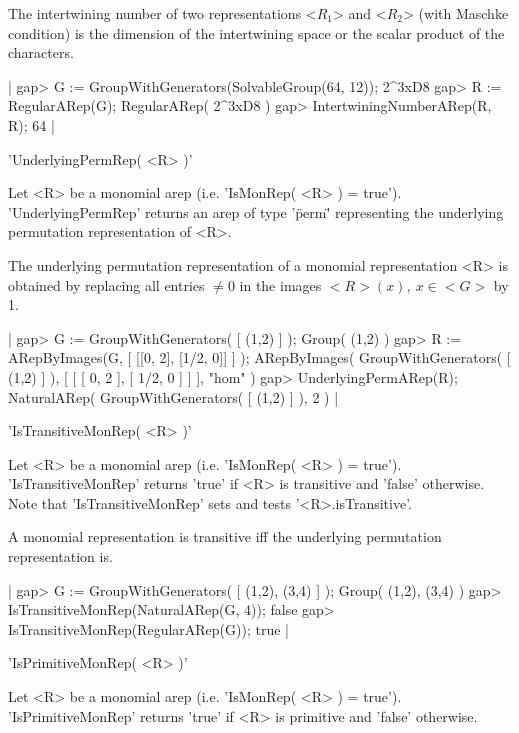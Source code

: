 The intertwining number of two representations <$R_1$> and <$R_2$>
(with Maschke condition) is the dimension of the intertwining space
or the scalar product of the characters.

|    gap> G := GroupWithGenerators(SolvableGroup(64, 12));
    2^3xD8
    gap> R := RegularARep(G);
    RegularARep( 2^3xD8 )
    gap> IntertwiningNumberARep(R, R);
    64 |


'UnderlyingPermRep( <R> )'

Let <R> be a monomial arep (i.e. 'IsMonRep( <R> ) = true').
'UnderlyingPermRep' returns an arep of type '\"perm\"' 
representing the underlying permutation representation of <R>. 

The underlying permutation representation of a monomial
representation <R> is obtained by replacing all entries 
$\neq 0$ in the images $<R>(x),\ x\in <G>$ by 1.

|    gap> G := GroupWithGenerators( [ (1,2) ] );
    Group( (1,2) )
    gap> R := ARepByImages(G, [ [[0, 2], [1/2, 0]] ] );
    ARepByImages(
      GroupWithGenerators( [ (1,2) ] ),
      [ [ [ 0, 2 ], [ 1/2, 0 ] ]
      ],
      "hom"
    )
    gap> UnderlyingPermARep(R);
    NaturalARep( GroupWithGenerators( [ (1,2) ] ), 2 ) |


'IsTransitiveMonRep( <R> )'

Let <R> be a monomial arep (i.e. 'IsMonRep( <R> ) = true').
'IsTransitiveMonRep' returns 'true' if <R> is transitive 
and 'false' otherwise.
Note that 'IsTransitiveMonRep' sets and tests '<R>.isTransitive'.

A monomial representation is transitive iff the underlying 
permutation representation is.

|    gap> G := GroupWithGenerators( [ (1,2), (3,4) ] );
    Group( (1,2), (3,4) )
    gap> IsTransitiveMonRep(NaturalARep(G, 4));
    false
    gap> IsTransitiveMonRep(RegularARep(G));   
    true |


'IsPrimitiveMonRep( <R> )'

Let <R> be a monomial arep (i.e. 'IsMonRep( <R> ) = true').
'IsPrimitiveMonRep' returns 'true' if <R> is primitive 
and 'false' otherwise.

